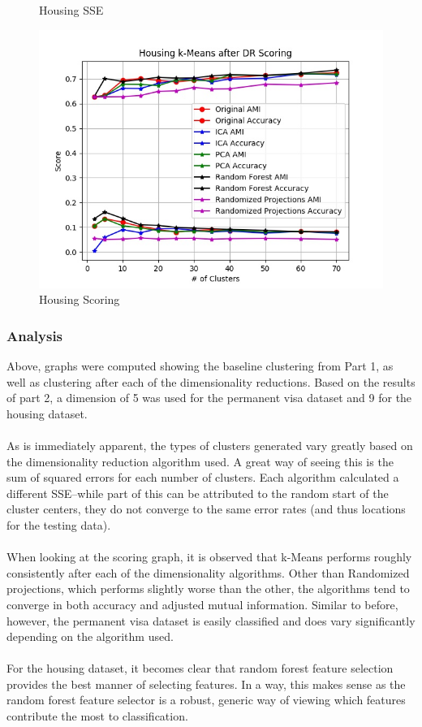 \documentclass[h]{article}
\begin{document}
\begin{figure}[H]
      \caption*{Housing SSE} 
   \endminipage\hfill
      \includegraphics[width=1\textwidth,keepaspectratio]{housing_k-means_after_dr_scoring.jpg} 
      \caption*{Housing Scoring} 
   \endminipage\hfill
  \end{figure}
  
\subsubsection*{Analysis}
Above, graphs were computed showing the baseline clustering from Part 1, as well 
as clustering after each of the dimensionality reductions.  Based on the results of part 2, 
a dimension of 5 was used for the permanent visa dataset and 9 for the housing 
dataset.
\\ \\ 
As is immediately apparent, the types of clusters generated vary greatly based on the 
dimensionality reduction algorithm used.  A great way of seeing this is the 
sum of squared errors for each number of clusters.  Each algorithm calculated a 
different SSE--while part of this can be attributed to the random start of the 
cluster centers, they do not converge to the same error rates (and thus 
locations for the testing data).
\\ \\
When looking at the scoring graph, it is observed that k-Means performs roughly consistently 
after each of the dimensionality algorithms.  Other than Randomized projections, 
which performs slightly worse than the other, the algorithms tend to converge in 
both accuracy and adjusted mutual information.  Similar to before, however, the 
permanent visa dataset is easily classified and does vary 
significantly depending on the algorithm used.
\\ \\
For the housing dataset, it becomes clear that random forest feature selection 
provides the best manner of selecting features.  In a way, this makes sense as 
the random forest feature selector is a robust, generic way of viewing which 
features contribute the most to classification.
\end{document}
